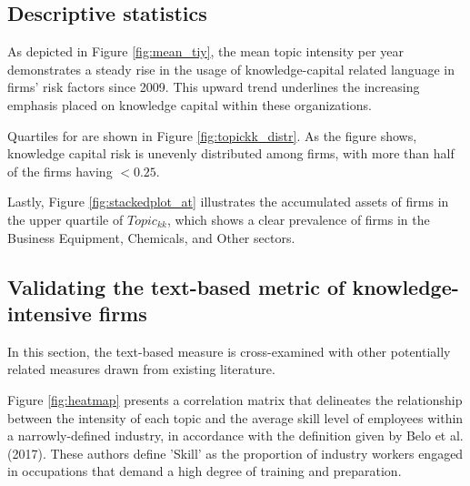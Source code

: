 \documentclass[12pt, letterpaper]{article}
\begin{document}

\subsection{Descriptive statistics}

As depicted in Figure \ref{fig:mean_tiy}, the mean topic intensity per year demonstrates a steady rise in the usage of knowledge-capital related language in firms' risk factors since 2009. This upward trend underlines the increasing emphasis placed on knowledge capital within these organizations.


Quartiles for \tkk are shown in Figure \ref{fig:topickk_distr}. As the figure shows, knowledge capital risk is unevenly distributed among firms, with more than half of the firms having \tkk $< 0.25$.


Lastly, Figure \ref{fig:stackedplot_at} illustrates the accumulated assets of firms in the upper quartile of $Topic_{kk}$, which shows a clear prevalence of firms in the Business Equipment, Chemicals, and Other sectors.




\subsection{Validating the text-based metric of knowledge-intensive firms}
  
In this section, the text-based measure \tkk  is cross-examined with other potentially related measures drawn from existing literature.

Figure \ref{fig:heatmap} presents a correlation matrix that delineates the relationship between the intensity of each topic and the average skill level of employees within a narrowly-defined industry, in accordance with the definition given by Belo et al. (2017). These authors define 'Skill' as the proportion of industry workers engaged in occupations that demand a high degree of training and preparation.
\end{document}
